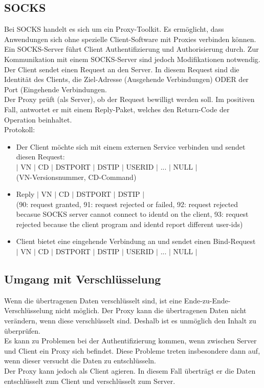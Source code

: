 \documentclass{article} %
\begin{document}
\subsection{SOCKS}
Bei SOCKS handelt es sich um ein Proxy-Toolkit. Es ermöglicht, dass Anwendungen sich ohne spezielle Client-Software mit Proxies verbinden können. Ein SOCKS-Server führt Client Authentifizierung und Authorisierung durch. Zur Kommunikation mit einem SOCKS-Server sind jedoch Modifikationen notwendig.\\

\noindent Der Client sendet einen Request an den Server. In diesem Request sind die Identität des Clients, die Ziel-Adresse (Ausgehende Verbindungen) ODER der Port (Eingehende Verbindungen.\\
Der Proxy prüft (als Server), ob der Request bewilligt werden soll. Im positiven Fall, antwortet er mit einem Reply-Paket, welches den Return-Code der Operation beinhaltet.\\
Protokoll:
	\begin{itemize}
	\item Der Client möchte sich mit einem externen Service verbinden und sendet diesen Request:\\
		$|$ VN $|$ CD $|$ DSTPORT $|$ DSTIP $|$ USERID $|$ ... $|$ NULL $|$\\
		(VN-Versionsnummer, CD-Command)
	\item Reply
		$|$ VN $|$ CD $|$ DSTPORT $|$ DSTIP $|$ \\
		(90: request granted, 91: request rejected or failed, 92: request rejected
		becasue SOCKS server cannot connect to identd on the client, 93: request
		rejected because the client program and identd report different user-ids)
	\item Client bietet eine eingehende Verbindung an und sendet einen Bind-Request\\
	$|$ VN $|$ CD $|$ DSTPORT $|$ DSTIP $|$ USERID $|$ ... $|$ NULL $|$
	\end{itemize}

\subsection{Umgang mit Verschlüsselung}
Wenn die übertragenen Daten verschlüsselt sind, ist eine Ende-zu-Ende-Verschlüsselung nicht möglich. Der Proxy kann die übertragenen Daten nicht verändern, wenn diese verschlüsselt sind. Deshalb ist es unmöglich den Inhalt zu überprüfen.\\
Es kann zu Problemen bei der Authentifizierung kommen, wenn zwischen Server und Client ein Proxy sich befindet. Diese Probleme treten insbesondere dann auf, wenn dieser versucht die Daten zu entschlüsseln.\\
Der Proxy kann jedoch als Client agieren. In diesem Fall überträgt er die Daten entschlüsselt zum Client und verschlüsselt zum Server.
\end{document}
